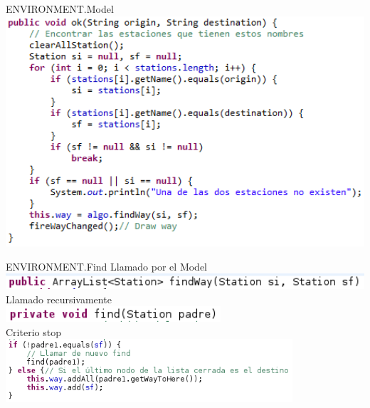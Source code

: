 \documentclass[11pt]{beamer}
\begin{document}
\begin{frame}{ENVIRONMENT.Model}
\includegraphics[width=1\textwidth]{images/ok.png}
\end{frame}

\begin{frame}{ENVIRONMENT.Find}
Llamado por el Model
\includegraphics[width=1\textwidth]{images/findWay.png}
\vspace{0.5cm}
Llamado recursivamente\\
\includegraphics[width=0.6\textwidth]{images/find.png}
\vspace{0.5cm}
\\
Criterio stop\\
\includegraphics[width=0.8\textwidth]{images/findStop.png}
\end{frame}
\end{document}
